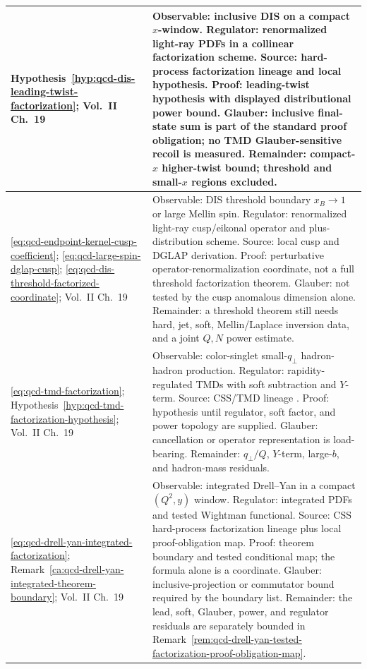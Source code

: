 {\begin{longtable}{@{}>{\raggedright\arraybackslash}p{}>{\raggedright\arraybackslash}p{}@{}}
Hypothesis~\ref{hyp:qcd-dis-leading-twist-factorization};
Vol.~II Ch.~19 &
Observable: inclusive DIS on a compact \(x\)-window.  Regulator: renormalized
light-ray PDFs in a collinear factorization scheme.  Source: hard-process
factorization lineage \cite{CollinsSoperSterman1989Factorization} and local
hypothesis.  Proof: leading-twist hypothesis with displayed distributional
power bound.  Glauber: inclusive final-state sum is part of the standard proof
obligation; no TMD Glauber-sensitive recoil is measured.  Remainder:
compact-\(x\) higher-twist bound; threshold and small-\(x\) regions excluded.
\\ \hline
\eqref{eq:qcd-endpoint-kernel-cusp-coefficient};
\eqref{eq:qcd-large-spin-dglap-cusp};
\eqref{eq:qcd-dis-threshold-factorized-coordinate};
Vol.~II Ch.~19 &
Observable: DIS threshold boundary \(x_B\to1\) or large Mellin spin.  Regulator:
renormalized light-ray cusp/eikonal operator and plus-distribution scheme.
Source: local cusp and DGLAP derivation.  Proof: perturbative
operator-renormalization coordinate, not a full threshold factorization theorem.
Glauber: not tested by the cusp anomalous dimension alone.  Remainder: a
threshold theorem still needs hard, jet, soft, Mellin/Laplace inversion data,
and a joint \(Q,N\) power estimate.
\\ \hline
\eqref{eq:qcd-tmd-factorization};
Hypothesis~\ref{hyp:qcd-tmd-factorization-hypothesis};
Vol.~II Ch.~19 &
Observable: color-singlet small-\(q_\perp\) hadron-hadron production.
Regulator: rapidity-regulated TMDs with soft subtraction and \(Y\)-term.
Source: CSS/TMD lineage \cite{CollinsSoperSterman1989Factorization}.  Proof:
hypothesis until regulator, soft factor, and power topology are supplied.
Glauber: cancellation or operator representation is load-bearing.  Remainder:
\(q_\perp/Q\), \(Y\)-term, large-\(b\), and hadron-mass residuals.
\\ \hline
\eqref{eq:qcd-drell-yan-integrated-factorization};
Remark~\ref{ca:qcd-drell-yan-integrated-theorem-boundary};
Vol.~II Ch.~19 &
Observable: integrated Drell--Yan in a compact \((Q^2,y)\) window.  Regulator:
integrated PDFs and tested Wightman functional.  Source: CSS hard-process
factorization lineage \cite{CollinsSoperSterman1989Factorization} plus local
proof-obligation map.  Proof: theorem boundary and tested conditional map;
the formula alone is a coordinate.  Glauber: inclusive-projection or
commutator bound required by the boundary list.  Remainder: the lead, soft,
Glauber, power, and regulator residuals are separately bounded in
Remark~\ref{rem:qcd-drell-yan-tested-factorization-proof-obligation-map}.

\end{longtable}}
